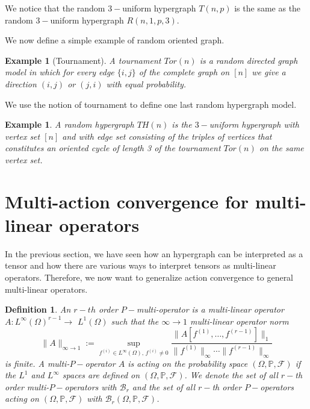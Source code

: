 \documentclass[11pt]{article}
\newtheorem{definition}[theorem]{Definition}
\newtheorem{example}[theorem]{Example}
\def\P{\mathbb{P}}
\begin{document}
We notice that the random $3-$uniform hypergraph $T(n,p)$ is the same as the random $3-$uniform hypergraph $R(n,1,p,3)$.

We now define a simple example of random oriented graph.

\begin{example}[Tournament]\label{RandtournGraph}
A tournament $Tor(n)$ is a random directed graph model in which for every edge $\{i,j\}$ of the complete graph on $[n]$ we give a direction $(i,j)$ or $(j,i)$ with equal probability.
\end{example}

We use the notion of tournament to define one last random hypergraph model.

\begin{example}\label{RandHyperTourn}
A random hypergraph $TH(n)$ is the $3-$uniform hypergraph with vertex set $[n]$ and with edge set consisting of the triples of vertices that constitutes an oriented cycle of length 3 of the tournament $Tor(n)$ on the same vertex set. 
\end{example}
\section{Multi-action convergence for multi-linear operators}\label{SecMultiActConv}

In the previous section, we have seen how an hypergraph can be interpreted as a tensor and how there are various ways to interpret tensors as multi-linear operators. Therefore, we now want to generalize action convergence to general multi-linear operators.  

\begin{definition}
An $r-th$ order $P-$multi-operator  is a multi-linear operator $A: L^{\infty}(\Omega) ^{r-1}\rightarrow$ $L^{1}(\Omega)$ such that the $\infty\rightarrow 1$ multi-linear operator norm 
\begin{equation*}
\|A\|_{\infty\rightarrow 1}:=\sup_{f^{(i)}\in L^{\infty}(\Omega), \, f^{(i)}\neq 0}\frac{\|A[f^{(1)},\ldots,f^{(r-1)}]\|_{ 1}}{\|f^{(1)}\|_{ \infty}\cdots\|f^{(r-1)}\|_{ \infty}}
\end{equation*}is finite. A multi-$P-$operator $A$ is acting on the probability space $(\Omega, \P,\mathcal{F})$ if the $L^1$ and $L^\infty$ spaces are defined on $(\Omega, \P,\mathcal{F})$. We denote the set of all $r-$th order multi-$P-$operators with $\mathcal{B}_r$ and the set of all $r-$th order $P-$operators acting on $(\Omega, \P,\mathcal{F})$ with $\mathcal{B}_r(\Omega, \P,\mathcal{F})$.
\end{definition}
\end{document}
